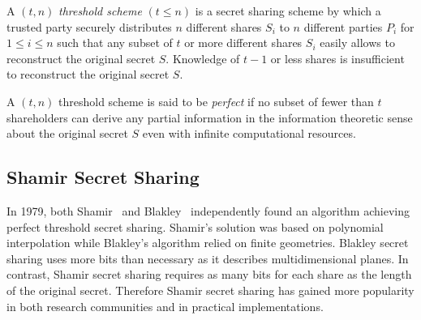\begin{defn}
\label{def:threshold_scheme}
 A $\left( t, n \right)$ \textit{threshold scheme} $\left( t \leq n \right)$ is a secret sharing scheme by which a trusted party securely distributes $n$ different shares $S_i$ to $n$ different parties $P_i$ for $1 \leq i \leq n$ such that any subset of $t$ or more different shares $S_i$ easily allows to reconstruct the original secret $S$. Knowledge of $t-1$ or less shares is insufficient to reconstruct the original secret $S$.
\end{defn}

\begin{defn}
\label{def:threshold_scheme}
 A $\left( t, n \right)$ threshold scheme is said to be \textit{perfect} if no subset of fewer than $t$ shareholders can derive any partial information in the information theoretic sense about the original secret $S$ even with infinite computational resources.
\end{defn}

\subsection{Shamir Secret Sharing}
In 1979, both Shamir~\cite{art:Shamir79} and Blakley~\cite{art:Blakley79} independently found an algorithm achieving perfect threshold secret sharing. Shamir's solution was based on polynomial interpolation while Blakley's algorithm relied on finite geometries. Blakley secret sharing uses more bits than necessary as it describes multidimensional planes. In contrast, Shamir secret sharing requires as many bits for each share as the length of the original secret. Therefore Shamir secret sharing has gained more popularity in both research communities and in practical implementations.

